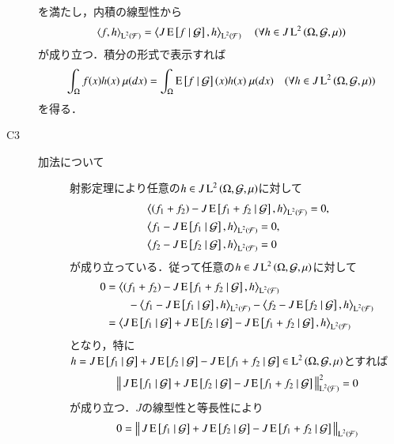\begin{prf}
\begin{description}
\begin{align}
				\end{align}
				を満たし，内積の線型性から
				\begin{align}
					\inprod<f, h>_{\Lp{2}{\mathcal{F}}} = \inprod<J\cexp{f}{\mathcal{G}}, h>_{\Lp{2}{\mathcal{F}}} \quad (\forall h \in J\Lp{2}{\Omega, \mathcal{G},\mu})
				\end{align}
				が成り立つ．積分の形式で表示すれば
				\begin{align}
					\int_{\Omega} f(x)h(x)\ \mu(dx) = \int_{\Omega} \operatorname{E} \left[ f \ \middle|\ \mathcal{G} \right](x)h(x)\ \mu(dx) \quad (\forall h \in J\operatorname{L}^{2} \left(\Omega, \mathcal{G},\mu\right))
				\end{align}
				を得る．
				
			\item[C3]\mbox{}
				\begin{description}
					\item[加法について]
						射影定理により任意の$h \in J\operatorname{L}^{2} \left(\Omega, \mathcal{G},\mu\right)$に対して
						\begin{align}
							&\inprod<(f_1 + f_2) - J\cexp{f_1 + f_2}{\mathcal{G}}, h>_{\Lp{2}{\mathcal{F}}} = 0, \\
							&\inprod<f_1 - J\cexp{f_1}{\mathcal{G}}, h>_{\Lp{2}{\mathcal{F}}} = 0, \\
							&\inprod<f_2 - J\cexp{f_2}{\mathcal{G}}, h>_{\Lp{2}{\mathcal{F}}} = 0
						\end{align}
						が成り立っている．従って任意の$h \in J\operatorname{L}^{2} \left(\Omega, \mathcal{G},\mu\right)$に対して
						\begin{align}
							0 &= \inprod<(f_1 + f_2) - J\cexp{f_1 + f_2}{\mathcal{G}}, h>_{\Lp{2}{\mathcal{F}}} \\
								&\qquad- \inprod<f_1 - J\cexp{f_1}{\mathcal{G}}, h>_{\Lp{2}{\mathcal{F}}} - \inprod<f_2 - J\cexp{f_2}{\mathcal{G}}, h>_{\Lp{2}{\mathcal{F}}} \\
							&= \inprod<J\cexp{f_1}{\mathcal{G}} + J\cexp{f_2}{\mathcal{G}} - J\cexp{f_1 + f_2}{\mathcal{G}}, h>_{\Lp{2}{\mathcal{F}}}
						\end{align}
						となり，特に$h = J\operatorname{E} \left[ f_1 \ \middle|\ \mathcal{G} \right] + J\operatorname{E} \left[ f_2 \ \middle|\ \mathcal{G} \right] - J\operatorname{E} \left[ f_1 + f_2 \ \middle|\ \mathcal{G} \right] \in \operatorname{L}^{2} \left(\Omega, \mathcal{G},\mu\right)$とすれば
						\begin{align}
							\left\|\, J\operatorname{E} \left[ f_1 \ \middle|\ \mathcal{G} \right] + J\operatorname{E} \left[ f_2 \ \middle|\ \mathcal{G} \right] - J\operatorname{E} \left[ f_1 + f_2 \ \middle|\ \mathcal{G} \right]\, \right\|_{\operatorname{L}^{2} \left(\mathcal{F}\right)}^2 = 0
						\end{align}
						が成り立つ．$J$の線型性と等長性により
						\begin{align}
							0 &= \Norm{J\cexp{f_1}{\mathcal{G}} + J\cexp{f_2}{\mathcal{G}} - J\cexp{f_1 + f_2}{\mathcal{G}}}{\Lp{2}{\mathcal{F}}} \\

\end{align}
\end{description}
\end{description}
\end{prf}
